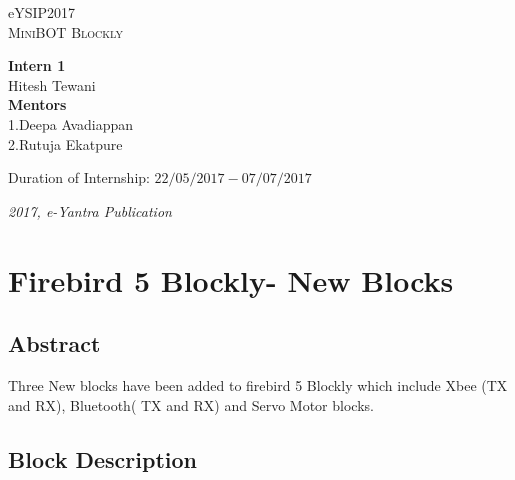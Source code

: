 \documentclass[a4paper,12pt,oneside]{book}
\begin{document}
\begin{titlepage}
\raggedright
{\Large eYSIP2017\\[1cm]}
{\Huge\scshape MiniBOT Blockly \\[.1in]}
\vfill
\begin{flushright}
\textbf{\large Intern 1 \\}
{\large Hitesh Tewani \\}
\textbf{\large  Mentors  \\}
{\large 1.Deepa Avadiappan\\}
{\large 2.Rutuja Ekatpure \\}

{\large Duration of Internship: $ 22/05/2017-07/07/2017 $ \\}
\end{flushright}

{\itshape 2017, e-Yantra Publication}
\end{titlepage}

\chapter[Project Tag]{Firebird 5 Blockly- New Blocks}
\section*{Abstract}
Three New blocks have been added to firebird 5 Blockly which include Xbee (TX and RX), Bluetooth( TX and RX) and Servo Motor blocks.


\section{Block Description}
\end{document}
